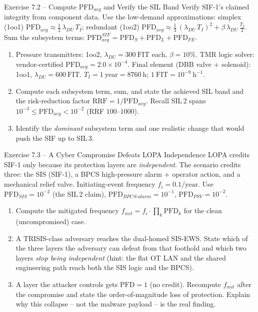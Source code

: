 \documentclass[11pt,a4paper]{article}
\begin{document}
\begin{taskbox}{Exercise 7.2 -- Compute $\mathrm{PFD}_{avg}$ and Verify the SIL Band}
Verify SIF-1's claimed integrity from component data. Use the low-demand
approximations: simplex (1oo1) $\mathrm{PFD}_{avg}\approx
\tfrac{1}{2}\,\lambda_{DU}\,T_I$; redundant (1oo2)
$\mathrm{PFD}_{avg}\approx \tfrac{1}{3}\,(\lambda_{DU}\,T_I)^2 +
\beta\,\lambda_{DU}\,\tfrac{T_I}{2}$. Sum the subsystem terms:
$\mathrm{PFD}_{avg}^{SIF}=\mathrm{PFD}_S+\mathrm{PFD}_L+\mathrm{PFD}_{FE}$.
\begin{enumerate}\setlength{\itemsep}{1pt}
  \item Pressure transmitters: 1oo2, $\lambda_{DU}=300\ \mathrm{FIT}$ each,
        $\beta=10\%$. TMR logic solver: vendor-certified
        $\mathrm{PFD}_{avg}=2.0\times10^{-4}$. Final element (DBB valve +
        solenoid): 1oo1, $\lambda_{DU}=600\ \mathrm{FIT}$.
        $T_I=1\ \mathrm{year}=8760\ \mathrm{h}$; $1\ \mathrm{FIT}=10^{-9}\
        \mathrm{h^{-1}}$.
  \item Compute each subsystem term, sum, and state the achieved SIL band and
        the risk-reduction factor $\mathrm{RRF}=1/\mathrm{PFD}_{avg}$. Recall
        SIL\,2 spans $10^{-3}\le\mathrm{PFD}_{avg}<10^{-2}$ (RRF $100$--$1000$).
  \item Identify the \emph{dominant} subsystem term and one realistic change
        that would push the SIF up to SIL\,3.
\end{enumerate}
\end{taskbox}

\begin{taskbox}{Exercise 7.3 -- A Cyber Compromise Defeats LOPA Independence}
LOPA credits SIF-1 only because its protection layers are \emph{independent}.
The scenario credits three: the SIS (SIF-1), a BPCS high-pressure alarm +
operator action, and a mechanical relief valve. Initiating-event frequency
$f_i = 0.1/\mathrm{year}$. Use $\mathrm{PFD}_{SIS}=10^{-2}$ (the SIL\,2 claim),
$\mathrm{PFD}_{BPCS\text{-}alarm}=10^{-1}$, $\mathrm{PFD}_{PSV}=10^{-2}$.
\begin{enumerate}\setlength{\itemsep}{1pt}
  \item Compute the mitigated frequency
        $f_{mit}=f_i\cdot\prod_k \mathrm{PFD}_k$ for the clean (uncompromised)
        case.
  \item A TRISIS-class adversary reaches the dual-homed SIS-EWS. State which of
        the three layers the adversary can defeat from that foothold and which
        two layers \emph{stop being independent} (hint: the flat OT LAN and the
        shared engineering path reach both the SIS logic and the BPCS).
  \item A layer the attacker controls gets $\mathrm{PFD}=1$ (no credit).
        Recompute $f_{mit}$ after the compromise and state the
        order-of-magnitude loss of protection. Explain why this collapse -- not
        the
        malware payload -- is the real finding.
\end{enumerate}
\end{taskbox}
\end{document}
